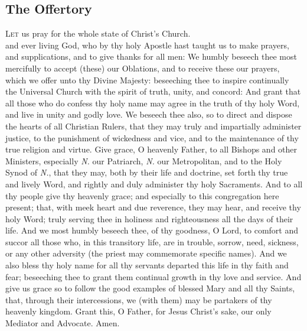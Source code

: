 \subsection{The Offertory}
\textsc{Let} us pray for the whole state of Christ’s Church.\\
 and ever living God, who by thy holy Apostle hast taught us to make prayers, and supplications, and to give thanks for all men: We humbly beseech thee most mercifully to accept (these) our Oblations, and to receive these our prayers, which we offer unto thy Divine Majesty: beseeching thee to inspire continually the Universal Church with the spirit of truth, unity, and concord: And grant that all those who do confess thy holy name may agree in the truth of thy holy Word, and live in unity and godly love. We beseech thee also, so to direct and dispose the hearts of all Christian Rulers, that they may truly and impartially administer justice, to the punishment of wickedness and vice, and to the maintenance of thy true religion and virtue. Give grace, O heavenly Father, to all Bishops and other Ministers, especially \textit{N.} our Patriarch, \textit{N.} our Metropolitan, and to the Holy Synod of \textit{N.}, that they may, both by their life and doctrine, set forth thy true and lively Word, and rightly and duly administer thy holy Sacraments. And to all thy people give thy heavenly grace; and especially to this congregation here present; that, with meek heart and due reverence, they may hear, and receive thy holy Word; truly serving thee in holiness and righteousness all the days of their life. And we most humbly beseech thee, of thy goodness, O Lord, to comfort and succor all those who, in this transitory life, are in trouble, sorrow, need, sickness, or any other adversity (the priest may commemorate specific names). And we also bless thy holy name for all thy servants departed this life in thy faith and fear; beseeching thee to grant them continual growth in thy love and service. And give us grace so to follow the good examples of blessed Mary and all thy Saints, that, through their intercessions, we (with them) may be partakers of thy heavenly kingdom. Grant this, O Father, for Jesus Christ's sake, our only Mediator and Advocate. Amen.
